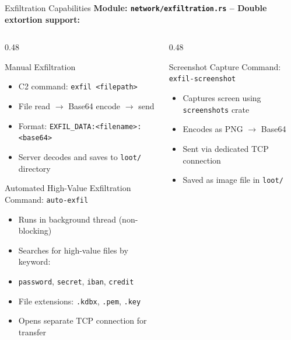 \documentclass[aspectratio=169]{beamer}
\newcommand{\code}[1]{\texttt{\textcolor{primaryblue}{#1}}}
\begin{document}
\begin{frame}{Exfiltration Capabilities}
  \textbf{Module: \code{network/exfiltration.rs} -- Double extortion support:}

  \vspace{0.5em}
  \begin{columns}[T]
    \begin{column}{0.48\textwidth}
      \begin{block}{Manual Exfiltration}
        \footnotesize
        \begin{itemize}
          \item C2 command: \code{exfil <filepath>}
          \item File read $\rightarrow$ Base64 encode $\rightarrow$ send
          \item Format: \code{EXFIL\_DATA:<filename>:<base64>}
          \item Server decodes and saves to \code{loot/} directory
        \end{itemize}
      \end{block}

      \vspace{0.3em}
      \begin{block}{Automated High-Value Exfiltration}
        \footnotesize
        Command: \code{auto-exfil}
        \begin{itemize}
          \item Runs in background thread (non-blocking)
          \item Searches for high-value files by keyword:
          \item \code{password}, \code{secret}, \code{iban}, \code{credit}
          \item File extensions: \code{.kdbx}, \code{.pem}, \code{.key}
          \item Opens separate TCP connection for transfer
        \end{itemize}
      \end{block}
    \end{column}
    \begin{column}{0.48\textwidth}
      \begin{block}{Screenshot Capture}
        \footnotesize
        Command: \code{exfil-screenshot}
        \begin{itemize}
          \item Captures screen using \code{screenshots} crate
          \item Encodes as PNG $\rightarrow$ Base64
          \item Sent via dedicated TCP connection
          \item Saved as image file in \code{loot/}
        \end{itemize}
      \end{block}


\end{column}
\end{columns}
\end{frame}
\end{document}
